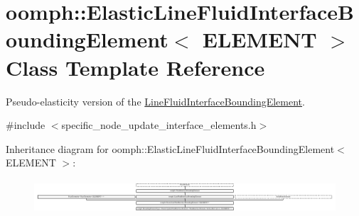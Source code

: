 \hypertarget{classoomph_1_1ElasticLineFluidInterfaceBoundingElement}{}\section{oomph\+:\+:Elastic\+Line\+Fluid\+Interface\+Bounding\+Element$<$ E\+L\+E\+M\+E\+NT $>$ Class Template Reference}
\label{classoomph_1_1ElasticLineFluidInterfaceBoundingElement}


Pseudo-\/elasticity version of the \hyperlink{classoomph_1_1LineFluidInterfaceBoundingElement}{Line\+Fluid\+Interface\+Bounding\+Element}.  




{\ttfamily \#include $<$specific\+\_\+node\+\_\+update\+\_\+interface\+\_\+elements.\+h$>$}

Inheritance diagram for oomph\+:\+:Elastic\+Line\+Fluid\+Interface\+Bounding\+Element$<$ E\+L\+E\+M\+E\+NT $>$\+:\begin{figure}[H]
\begin{center}
\leavevmode
\includegraphics[height=1.259559cm]{classoomph_1_1ElasticLineFluidInterfaceBoundingElement}
\end{center}
\end{figure}
